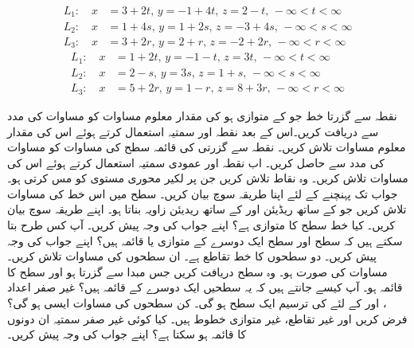 \begin{align*}
L_1:\quad x&=3+2t,\,y=-1+4t,\,z=2-t,\,-\infty<t<\infty\\
L_2:\quad x&=1+4s,\,y=1+2s,\,z=-3+4s,\,-\infty<s<\infty\\
L_3:\quad x&=3+2r,\, y=2+r,\,z=-2+2r,\,-\infty<r<\infty
\end{align*}
\begin{align*}
L_1:\quad x&=1+2t,\,y=-1-t,\,z=3t,\,-\infty<t<\infty\\
L_2:\quad x&=2-s,\,y=3s,\,z=1+s,\,-\infty<s<\infty\\
L_3:\quad x&=5+2r,\,y=1-r,\,z=8+3r,\,-\infty<r<\infty
\end{align*}

نقطہ  سے گزرتا خط جو  کے متوازی ہو کی مقدار معلوم مساوات   کو مساوات  کی مدد سے  دریافت کریں۔اس کے بعد نقطہ  اور سمتیہ  استعمال کرتے ہوئے اس کی مقدار معلوم مساوات تلاش کریں۔
نقطہ  سے گزرتی  کی قائمہ سطح کی مساوات کو  مساوات کی مدد سے حاصل کریں۔ اب نقطہ  اور عمودی سمتیہ  استعمال کرتے ہوئے اس کی مساوات تلاش کریں۔
وہ نقاط تلاش کریں جن پر لکیر  محوری مستوی کو مس کرتی ہو۔ جواب تک پہنچنے کے لئے اپنا   طریقہ سوچ بیان کریں۔
سطح  میں اس خط کی مساوات تلاش کریں جو  کے ساتھ  ریڈیئن اور  کے ساتھ  ریدیئن زاویہ بناتا ہو۔ اپنے طریقہ سوچ بیان کریں۔
کیا خط  سطح  کا متوازی ہے؟ اپنے جواب کی وجہ پیش کریں۔
آپ کس طرح بتا سکتے ہیں کہ سطح  اور سطح  ایک دوسرے کے متوازی  یا قائمہ ہیں؟ اپنے جواب کی وجہ پیش کریں۔
دو سطحوں کا خط تقاطع  ہے۔  ان سطحوں کی مساوات تلاش کریں۔ مساوات کی صورت  ہو۔
وہ سطح دریافت کریں جس مبدا سے گزرتا ہو اور سطح  کا قائمہ ہو۔ آپ کیسے جانتے ہیں کہ یہ سطحیں ایک دوسرے کے قائمہ ہیں؟
غیر صفر اعداد ،  اور  کے لئے  کی ترسیم ایک سطح ہو گی۔ کن سطحوں کی مساوات ایسی ہو گی؟
فرض کریں  اور  غیر  تقاطع، غیر متوازی خطوط ہیں۔ کیا کوئی غیر صفر سمتیہ ان دونوں کا قائمہ ہو سکتا ہے؟ اپنے جواب کی وجہ پیش کریں۔

